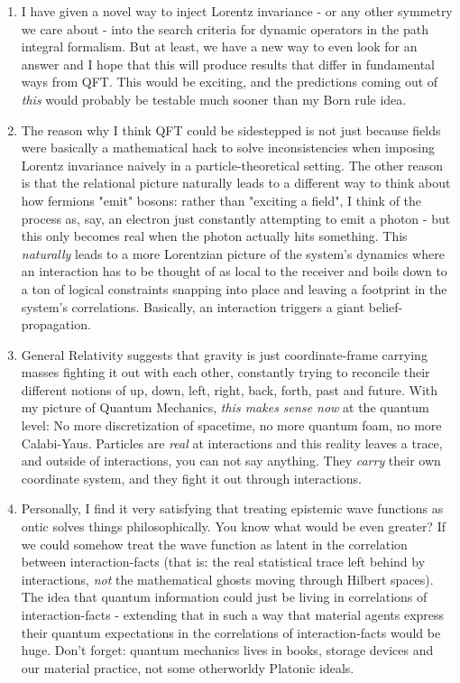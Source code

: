 \documentclass{article}
\begin{document}
\begin{enumerate}

\item I have given a novel way to inject Lorentz invariance - or any other symmetry we care about - into the search criteria for dynamic operators in the path integral formalism. But at least, we have a new way to even look for an answer and I hope that this will produce results that differ in fundamental ways from QFT. This would be exciting, and the predictions coming out of \textit{this} would probably be testable much sooner than my Born rule idea.

\item The reason why I think QFT could be sidestepped is not just because fields were basically a mathematical hack to solve inconsistencies when imposing Lorentz invariance naively in a particle-theoretical setting. The other reason is that the relational picture naturally leads to a different way to think about how fermions "emit" bosons: rather than "exciting a field", I think of the process as, say, an electron just constantly attempting to emit a photon - but this only becomes real when the photon actually hits something. This \textit{naturally} leads to a more Lorentzian picture of the system's dynamics where an interaction has to be thought of as local to the receiver and boils down to a ton of logical constraints snapping into place and leaving a footprint in the system's correlations. Basically, an interaction triggers a giant belief-propagation.

\item General Relativity suggests that gravity is just coordinate-frame carrying masses fighting it out with each other, constantly trying to reconcile their different notions of up, down, left, right, back, forth, past and future. With my picture of Quantum Mechanics, \textit{this makes sense now} at the quantum level: No more discretization of spacetime, no more quantum foam, no more Calabi-Yaus. Particles are \textit{real} at interactions and this reality leaves a trace, and outside of interactions, you can not say anything. They \textit{carry} their own coordinate system, and they fight it out through interactions.

\item Personally, I find it very satisfying that treating epistemic wave functions as ontic solves things philosophically. You know what would be even greater? If we could somehow treat the wave function as latent in the correlation between interaction-facts (that is: the real statistical trace left behind by interactions, \textit{not} the mathematical ghosts moving through Hilbert spaces). The idea that quantum information could just be living in correlations of interaction-facts - extending that in such a way that material agents express their quantum expectations in the correlations of interaction-facts would be huge. Don't forget: quantum mechanics lives in books, storage devices and our material practice, not some otherworldy Platonic ideals.


\end{enumerate}
\end{document}
